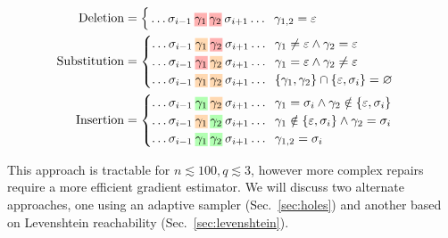 \documentclass[sigplan,review,anonymous,acmsmall]{acmart}\settopmatter{printfolios=false,printccs=false,printacmref=false}
\begin{document}
\begin{align*}
    \text{Deletion}&=\begin{cases}
                         \,\ldots\sigma_{i-1}\:\text{\hlred{$\gamma_1$}\:\hlred{$\gamma_2$}}\:\sigma_{i+1}\ldots\hspace{0.2cm}\gamma_{1, 2} = \varepsilon\label{eq:del}
    \end{cases}\\
    \text{Substitution}&=\begin{cases}
                             \ldots\sigma_{i-1}\:\text{\hlorange{$\gamma_1$}\:\hlred{$\gamma_2$}}\:\sigma_{i+1}\ldots\hspace{0.2cm}\gamma_1 \neq \varepsilon \land \gamma_2 = \varepsilon\\
                             \ldots\sigma_{i-1}\:\text{\hlred{$\gamma_1$}\:\hlorange{$\gamma_2$}}\:\sigma_{i+1}\ldots\hspace{0.2cm}\gamma_1 = \varepsilon \land \gamma_2 \neq \varepsilon\\
                             \ldots\sigma_{i-1}\:\text{\hlorange{$\gamma_1$}\:\hlorange{$\gamma_2$}}\:\sigma_{i+1}\ldots\hspace{0.2cm}\{\gamma_1, \gamma_2\}\cap\{\varepsilon, \sigma_i\} = \varnothing
    \end{cases}\\
    \text{Insertion}&=\begin{cases}
                          \ldots\sigma_{i-1}\:\text{\hlgreen{$\gamma_1$}\:\hlorange{$\gamma_2$}}\:\sigma_{i+1}\ldots\hspace{0.2cm}\gamma_1 = \sigma_i \land \gamma_2 \notin \{\varepsilon,  \sigma_i\}\label{eq:ins2}\\
                          \ldots\sigma_{i-1}\:\text{\hlorange{$\gamma_1$}\:\hlgreen{$\gamma_2$}}\:\sigma_{i+1}\ldots\hspace{0.2cm}\gamma_1 \notin \{\varepsilon, \sigma_i\} \land \gamma_2 = \sigma_i\label{eq:ins1}\\
                          \ldots\sigma_{i-1}\:\text{\hlgreen{$\gamma_1$}\:\hlgreen{$\gamma_2$}}\:\sigma_{i+1}\ldots\hspace{0.2cm}\gamma_{1,2} = \sigma_i\label{eq:copy}
    \end{cases}
\end{align*}

\noindent This approach is tractable for $n \lesssim 100, q \lesssim 3$, however more complex repairs require a more efficient gradient estimator. We will discuss two alternate approaches, one using an adaptive sampler (Sec.~\ref{sec:holes}) and another based on Levenshtein reachability (Sec.~\ref{sec:levenshtein}).
\end{document}
